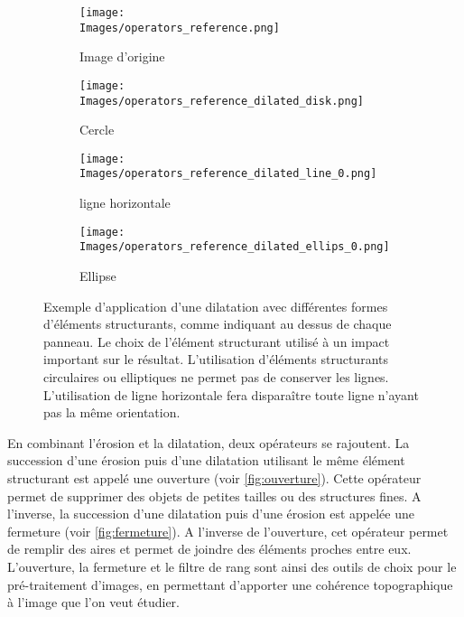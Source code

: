 \documentclass[\main/main.tex]{subfiles}
\providecommand{\Images}{\main/Figures/intro_seg}
\begin{document}
\begin{figure}[h!]
    \centering
    \begin{subfigure}[b]{0.45\textwidth}
       \caption{
       Image d'origine
            }
       \centering \texttt{[image: \\Images/operators\_reference.png]}
    \end{subfigure}
    \begin{subfigure}[b]{0.45\textwidth}
       \caption{
       Cercle
            }
       \centering \texttt{[image: \\Images/operators\_reference\_dilated\_disk.png]}
    \end{subfigure}
    \begin{subfigure}[b]{0.45\textwidth}
       \caption{
       ligne horizontale
            }
       \centering \texttt{[image: \\Images/operators\_reference\_dilated\_line\_0.png]}
    \end{subfigure}
    \begin{subfigure}[b]{0.45\textwidth}
       \caption{
       Ellipse
            }
       \centering \texttt{[image: \\Images/operators\_reference\_dilated\_ellips\_0.png]}
    \end{subfigure}
    \caption{
        \label{fig:morpho:es}
        Exemple d'application d'une dilatation avec différentes formes d'éléments structurants, comme indiquant au dessus de chaque panneau.
        \newline
        Le choix de l'élément structurant utilisé à un impact important sur le résultat.
        L'utilisation d'éléments structurants circulaires ou elliptiques ne permet pas de conserver les lignes.
        L'utilisation de ligne horizontale fera disparaître toute ligne n'ayant pas la même orientation.
    }
    
\end{figure}
%
%
En combinant l'érosion et la dilatation, deux opérateurs se rajoutent.
%
La succession d'une érosion puis d'une dilatation utilisant le même élément structurant
est appelé une ouverture
(voir \autoref{fig:ouverture}).
%
Cette opérateur permet de supprimer des objets de petites tailles ou des structures fines.
%
A l'inverse, la succession d'une dilatation puis d'une érosion est appelée une fermeture
(voir \autoref{fig:fermeture}).
%
A l'inverse de l'ouverture, cet opérateur permet de remplir des aires et permet de joindre des éléments proches entre eux.
%
L'ouverture, la fermeture et le filtre de rang sont ainsi des outils de choix pour le pré\hyp{}traitement d'images, en permettant d'apporter une cohérence topographique à l'image que l'on veut étudier.
\end{document}
